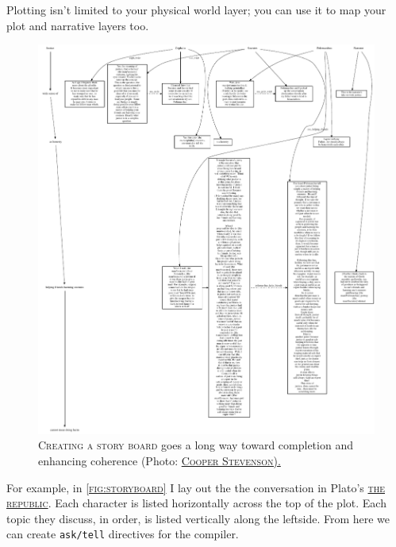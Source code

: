 \noindent Plotting isn't limited to your physical world layer; you can use it to map your plot and narrative layers too.

\begin{figure}[h]
 \includegraphics[width=\linewidth]{./media/images/story_board.pdf}%
  \small{\textsc{\\ Creating a story board} goes a long way toward completion
    and enhancing coherence (Photo:
    \href{http://portfolio.cooper.stevenson.name}{\textsc{Cooper Stevenson).}}}
  \label{fig:storyboard}%
\end{figure}
For example, in \textsc{\vref{fig:storyboard}} I lay out the the conversation in Plato's
\href{https://www.gutenberg.org/files/1497/1497-h/1497-h.htm}{\textsc{the
    republic}}. Each character is listed horizontally across the top of the plot. Each topic they discuss, in order, is listed vertically along the
left\textendash side. From here we can create \small{\texttt{ask/tell}} directives for
the compiler.


